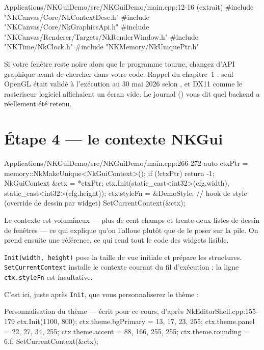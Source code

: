 \begin{nkcode}{Applications/NKGuiDemo/src/NKGuiDemo/main.cpp:12-16 (extrait)}
#include "NKCanvas/Core/NkContextDesc.h"
#include "NKCanvas/Core/NkGraphicsApi.h"
#include "NKCanvas/Renderer/Targets/NkRenderWindow.h"
#include "NKTime/NkClock.h"
#include "NKMemory/NkUniquePtr.h"
\end{nkcode}

\begin{nkretenir}
Si votre fenêtre reste noire alors que le programme tourne, changez d'API
graphique avant de chercher dans votre code. Rappel du chapitre~1 : seul OpenGL
était validé à l'exécution au 30 mai 2026 selon
, et DX11 comme le rasteriseur
logiciel affichaient un écran vide. Le journal
() vous dit quel backend a réellement été retenu.
\end{nkretenir}

\section{Étape 4 — le contexte NKGui}

\begin{nkcode}{Applications/NKGuiDemo/src/NKGuiDemo/main.cpp:266-272}
    auto ctxPtr = memory::NkMakeUnique<NkGuiContext>();
    if (!ctxPtr)
        return -1;
    NkGuiContext &ctx = *ctxPtr;
    ctx.Init(static_cast<int32>(cfg.width), static_cast<int32>(cfg.height));
    ctx.styleFn = &DemoStyle; // hook de style (override de dessin par widget)
    SetCurrentContext(&ctx);
\end{nkcode}

Le contexte est volumineux — plus de cent champs et trente-deux listes de dessin
de fenêtres — ce qui explique qu'on l'alloue plutôt que de le poser sur la pile.
On prend ensuite une référence, ce qui rend tout le code des widgets lisible.

\texttt{Init(width, height)} pose la taille de vue initiale et prépare les
structures. \texttt{SetCurrentContext} installe le contexte courant du fil
d'exécution ; la ligne \texttt{ctx.styleFn} est facultative.

C'est ici, juste après \texttt{Init}, que vous personnaliserez le thème :

\begin{nkcode}{Personnalisation du thème — écrit pour ce cours, d'après NkEditorShell.cpp:155-179}
    ctx.Init(1100, 800);
    ctx.theme.bgPrimary = {13, 17, 23, 255};
    ctx.theme.panel     = {22, 27, 34, 255};
    ctx.theme.accent    = {88, 166, 255, 255};
    ctx.theme.rounding  = 6.f;
    SetCurrentContext(&ctx);
\end{nkcode}

